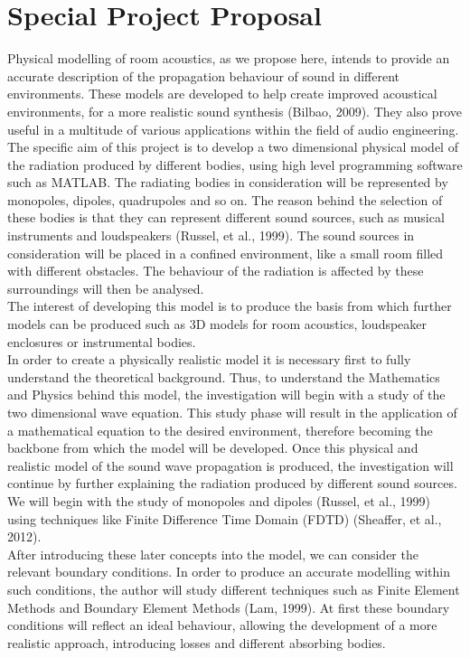\chapter{Special Project Proposal}
\label{appB}

Physical modelling of room acoustics, as we propose here, intends to provide an accurate description of the propagation behaviour of sound in different environments. These models are developed to help create improved acoustical environments, for a more realistic sound synthesis (Bilbao, 2009). They also prove useful in a multitude of various applications within the field of audio engineering.\\
The specific aim of this project is to develop a two dimensional physical model of the radiation produced by different bodies, using high level programming software such as MATLAB. The radiating bodies in consideration will be represented by monopoles, dipoles, quadrupoles and so on. The reason behind the selection of these bodies is that they can represent different sound sources, such as musical instruments and loudspeakers (Russel, et al., 1999). The sound sources in consideration will be placed in a confined environment, like a small room filled with different obstacles. The behaviour of the radiation is affected by these surroundings will then be analysed.\\ 
The interest of developing this model is to produce the basis from which further models can be produced such as 3D models for room acoustics, loudspeaker enclosures or instrumental bodies.\\
In order to create a physically realistic model it is necessary first to fully understand the theoretical background. Thus, to understand the Mathematics and Physics behind this model, the investigation will begin with a study of the two dimensional wave equation. This study phase will result in the application of a mathematical equation to the desired environment, therefore becoming the backbone from which the model will be developed. 
Once this physical and realistic model of the sound wave propagation is produced, the investigation will continue by further explaining the radiation produced by different sound sources. We will begin with the study of monopoles and dipoles (Russel, et al., 1999) using techniques like Finite Difference Time Domain (FDTD) (Sheaffer, et al., 2012). \\
After introducing these later concepts into the model, we can consider the relevant boundary conditions.
In order to produce an accurate modelling within such conditions, the author will study different techniques such as Finite Element Methods and Boundary Element Methods (Lam, 1999). At first these boundary conditions will reflect an ideal behaviour, allowing the development of a more realistic approach, introducing losses and different absorbing bodies.\\
